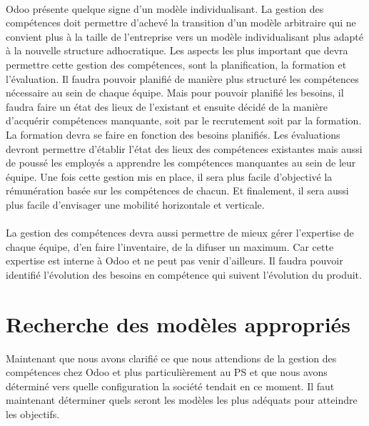 \paragraph{} Odoo présente quelque signe d'un modèle individualisant. La gestion des compétences doit permettre d'achevé la transition d'un modèle arbitraire qui ne convient plus à la taille de l'entreprise vers un modèle individualisant plus adapté à la nouvelle structure adhocratique. Les aspects les plus important que devra permettre cette gestion des compétences, sont la planification, la formation et l'évaluation. Il faudra pouvoir planifié de manière plus structuré les compétences nécessaire au sein de chaque équipe. Mais pour pouvoir planifié les besoins, il faudra faire un état des lieux de l'existant et ensuite décidé de la manière d'acquérir compétences manquante, soit par le recrutement soit par la formation. La formation devra se faire en fonction des besoins planifiés. Les évaluations devront permettre d'établir l'état des lieux des compétences existantes mais aussi de poussé les employés a apprendre les compétences manquantes au sein de leur équipe. Une fois cette gestion mis en place, il sera plus facile d'objectivé la rémunération basée sur les compétences de chacun. Et finalement, il sera aussi plus facile d'envisager une mobilité horizontale et verticale.

\paragraph{} La gestion des compétences devra aussi permettre de mieux gérer l'expertise de chaque équipe, d'en faire l'inventaire, de la difuser un maximum. Car cette expertise est interne à Odoo et ne peut pas venir d'ailleurs. Il faudra pouvoir identifié l'évolution des besoins en compétence qui suivent l'évolution du produit.



\section{Recherche des modèles appropriés}
Maintenant que nous avons clarifié ce que nous attendions de la gestion des compétences chez Odoo et plus particulièrement au PS et que nous avons déterminé vers quelle configuration la société tendait en ce moment. Il faut maintenant déterminer quels seront les modèles les plus adéquats pour atteindre les objectifs.


